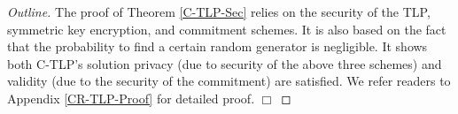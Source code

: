 \begin{proof}[Outline]
The proof of Theorem \ref{C-TLP-Sec} relies on the security of the TLP, symmetric key encryption, and commitment schemes. It is also based on the fact that the probability to  find a certain random generator is negligible. It shows both C-TLP's solution privacy (due to security of the above three schemes) and validity (due to the security of the commitment) are satisfied.  We refer readers to Appendix \ref{CR-TLP-Proof} for  detailed proof.  \hfill\(\Box\)
\end{proof}

\vspace{-2.5mm}
%
%
%
%
%
%
